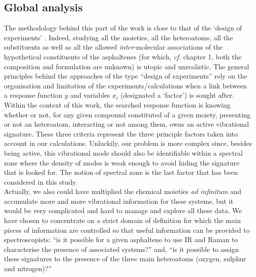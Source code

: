 \subsection{Global analysis}

The methodology behind this part of the work is close to that of the ‘design of experiments’ \cite{goupy2013introduction}. Indeed, studying all the moieties, all the heteroatoms, all the substituents as well as all the allowed \textit{inter}-molecular associations of the hypothetical constituents of the asphaltenes (for which, \textit{cf.} chapter 1, both the composition and formulation are unknown) is utopic and unrealistic. The general principles behind the approaches of the type “design of experiments” rely on the organisation and limitation of the experiments/calculations when a link between a response function $y$ and variables $x_i$ (designated a ‘factor’) is sought after. Within the context of this work, the searched response function is knowing whether or not, for any given compound constituted of a given moiety, presenting or not an heteroatom, interacting or not among them, owns an active vibrational signature. These three criteria represent the three principle factors taken into account in our calculations. Unluckily, our problem is more complex since, besides being active, this vibrational mode should also be identifiable within a spectral zone where the density of modes is weak enough to avoid hiding the signature that is looked for. The notion of spectral zone is the last factor that has been considered in this study.\\

Actually, we also could have multiplied the chemical moieties \textit{ad infinitum} and accumulate more and more vibrational information for these systems, but it would be very complicated and hard to manage and explore all these data. We have chosen to concentrate on a strict domain of definition for which the main pieces of information are controlled so that useful information can be provided to spectroscopists:  “is it possible for a given asphaltene to use IR and Raman to characterise the presence of associated systems?” and, “is it possible to assign these signatures to the presence of the three main heteroatoms (oxygen, sulphur and nitrogen)?”\\


